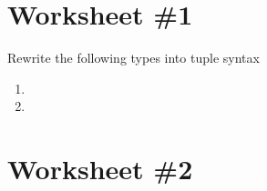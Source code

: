 \documentclass{article}
\begin{document}
\section{Worksheet \#1}

Rewrite the following types into tuple syntax

\begin{enumerate}

\item

\item

\end{enumerate}

\newpage

\section{Worksheet \#2}
\end{document}
